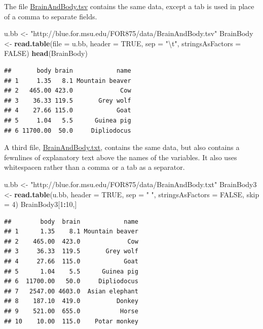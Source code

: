 \documentclass[]{article}
\newenvironment{Shaded}{\begin{snugshade}}{\end{snugshade}}
\newcommand{\KeywordTok}[1]{\textcolor[rgb]{0.13,0.29,0.53}{\textbf{#1}}}
\newcommand{\DataTypeTok}[1]{\textcolor[rgb]{0.13,0.29,0.53}{#1}}
\newcommand{\DecValTok}[1]{\textcolor[rgb]{0.00,0.00,0.81}{#1}}
\newcommand{\CharTok}[1]{\textcolor[rgb]{0.31,0.60,0.02}{#1}}
\newcommand{\StringTok}[1]{\textcolor[rgb]{0.31,0.60,0.02}{#1}}
\newcommand{\OtherTok}[1]{\textcolor[rgb]{0.56,0.35,0.01}{#1}}
\newcommand{\OperatorTok}[1]{\textcolor[rgb]{0.81,0.36,0.00}{\textbf{#1}}}
\newcommand{\NormalTok}[1]{#1}
\begin{document}
The file
\href{http://blue.for.msu.edu/FOR875/data/BrainAndBody.tsv}{BrainAndBody.tsv}
contains the same data, except a tab is used in place of a comma to
separate fields.

\begin{Shaded}
\begin{Highlighting}[]
\NormalTok{u.bb <-}\StringTok{ "http://blue.for.msu.edu/FOR875/data/BrainAndBody.tsv"}
\NormalTok{BrainBody <-}\StringTok{ }\KeywordTok{read.table}\NormalTok{(}\DataTypeTok{file =}\NormalTok{ u.bb, }\DataTypeTok{header =} \OtherTok{TRUE}\NormalTok{, }\DataTypeTok{sep =} \StringTok{"}\CharTok{\textbackslash{}t}\StringTok{"}\NormalTok{,}
\DataTypeTok{stringsAsFactors =} \OtherTok{FALSE}\NormalTok{)}
\KeywordTok{head}\NormalTok{(BrainBody)}
\end{Highlighting}
\end{Shaded}

\begin{verbatim}
##       body brain            name
## 1     1.35   8.1 Mountain beaver
## 2   465.00 423.0             Cow
## 3    36.33 119.5       Grey wolf
## 4    27.66 115.0            Goat
## 5     1.04   5.5      Guinea pig
## 6 11700.00  50.0     Dipliodocus
\end{verbatim}

A third file,
\href{\%22http://blue.for.msu.edu/FOR875/data/BrainAndBody.txt\%22}{BrainAndBody.txt},
contains the same data, but also contains a fewnlines of explanatory
text above the names of the variables. It also uses whitespacen rather
than a comma or a tab as a separator.

\begin{Shaded}
\begin{Highlighting}[]
\NormalTok{u.bb <-}\StringTok{ "http://blue.for.msu.edu/FOR875/data/BrainAndBody.txt"}
\NormalTok{BrainBody3 <-}\StringTok{ }\KeywordTok{read.table}\NormalTok{(u.bb, }\DataTypeTok{header =} \OtherTok{TRUE}\NormalTok{, }\DataTypeTok{sep =} \StringTok{" "}\NormalTok{, }\DataTypeTok{stringsAsFactors =} \OtherTok{FALSE}\NormalTok{, }\DataTypeTok{skip =} \DecValTok{4}\NormalTok{)}
\NormalTok{BrainBody3[}\DecValTok{1}\OperatorTok{:}\DecValTok{10}\NormalTok{,]}
\end{Highlighting}
\end{Shaded}

\begin{verbatim}
##        body  brain            name
## 1      1.35    8.1 Mountain beaver
## 2    465.00  423.0             Cow
## 3     36.33  119.5       Grey wolf
## 4     27.66  115.0            Goat
## 5      1.04    5.5      Guinea pig
## 6  11700.00   50.0     Dipliodocus
## 7   2547.00 4603.0  Asian elephant
## 8    187.10  419.0          Donkey
## 9    521.00  655.0           Horse
## 10    10.00  115.0    Potar monkey
\end{verbatim}
\end{document}
